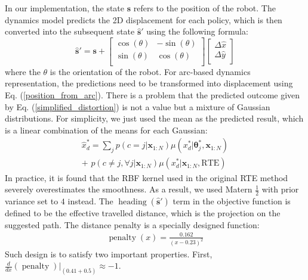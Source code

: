 In our implementation, the state $\bm{s}$ refers to the position of the robot. 
The dynamics model predicts the 2D displacement for each policy, which is then converted into the subsequent state $\hat{\bm{s}}'$ using the following formula:
\begin{equation}
\hat{\bm{s}}' = \bm{s} + 
\begin{bmatrix}
\cos (\theta) & -\sin(\theta) \\
\sin (\theta) & \cos(\theta) \\
\end{bmatrix}
%
\begin{bmatrix}
\Delta \hat{x} \\
\Delta \hat{y} \\
\end{bmatrix}
\label{predicted_subsequent_state}
\end{equation}
where the $\theta$ is the orientation of the robot.
For arc-based dynamics representation, the predictions need to be transformed into displacement using Eq. (\ref{position_from_arc}).
There is a problem that the predicted outcome given by Eq. (\ref{simplified_distortion}) is not a value but a mixture of Gaussian distributions.
For simplicity, we just used the mean as the predicted result, which is a linear combination of the means for each Gaussian:
\begin{equation}
\begin{gathered}
\hat{x}^*_d 
= \sum_j p(c=j| \bm{x}_{1:N}) \mu(x^*_d|\bm{\theta}^*_j, \bm{x}_{1:N})
\\
+ \,\, p(c \neq j, \forall j|\bm{x}_{1:N})  \mu(x^*_d|\bm{x}_{1:N}, \text{RTE})
\end{gathered}
\label{predicted_mean}
\end{equation}
In practice, it is found that the RBF kernel used in the original RTE method \cite{RTE} severely overestimates the smoothness.
As a result, we used Matern $\frac{1}{2}$ with prior variance set to $4$ instead.
The $\operatorname{heading}(\hat{\bm{s}}')$ term in the objective function is defined to be the effective travelled distance, which is the projection on the suggested path.
The distance penalty is a specially designed function:
\begin{equation}
\begin{gathered}
\operatorname{penalty}(x) = \frac{0.162}{(x - 0.23)^2}
\end{gathered}
\label{penalty}
\end{equation}
Such design is to satisfy two important properties.
First, $\frac{d}{d x} (\operatorname{penalty})|_{(0.41 + 0.5)} \approx -1$.
